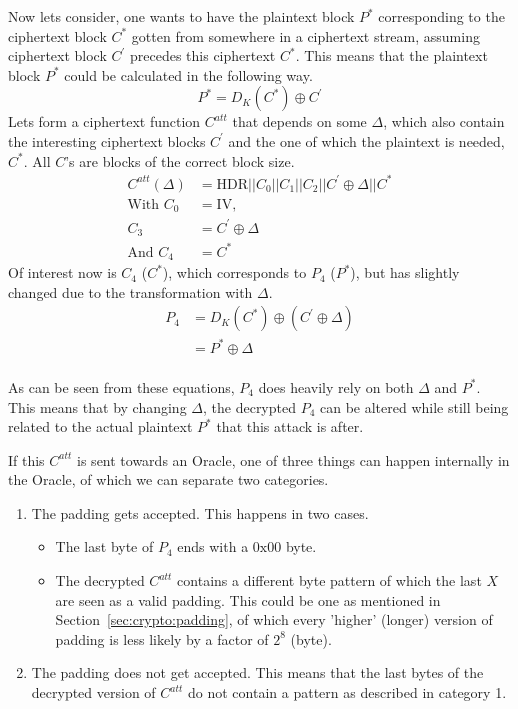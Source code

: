 \documentclass[10pt,conference,a4paper]{IEEEtran}
\begin{document}
Now lets consider, one wants to have the plaintext block $P^{*}$ corresponding to the ciphertext block $C^{*}$ gotten from somewhere in a ciphertext stream, assuming ciphertext block $C^{'}$ precedes this ciphertext $C^{*}$. This means that the plaintext block $P^{*}$ could be calculated in the following way.
\[ P^{*} = D_K(C^{*}) \oplus C^{'} \]
Lets form a ciphertext function $C^{att}$ that depends on some $\Delta$, which also contain the interesting ciphertext blocks $C^{'}$ and the one of which the plaintext is needed, $C^{*}$. All $C$'s are blocks of the correct block size.
\[ \begin{split}
C^{att}(\Delta) &= \text{HDR} || C_0 || C_1 || C_2 || C^{'} \oplus \Delta || C^{*} \\
\text{With } C_0 &= \text{IV}, \\
C_3 &= C^{'} \oplus \Delta \\
\text{And } C_4 &= C^{*}
\end{split}  \]
Of interest now is $C_4$ ($C^{*}$), which corresponds to $P_4$ ($P^{*}$), but has slightly changed due to the transformation with $\Delta$.
\[ \begin{split}
P_4 &= D_K(C^{*}) \oplus (C^{'} \oplus \Delta) \\
&= P^{*} \oplus \Delta \\
\end{split} \]

As can be seen from these equations, $P_4$ does heavily rely on both $\Delta$ and $P^{*}$. This means that by changing $\Delta$, the decrypted $P_4$ can be altered while still being related to the actual plaintext $P^{*}$ that this attack is after.

If this $C^{att}$ is sent towards an Oracle, one of three things can happen internally in the Oracle, of which we can separate two categories.
\begin{enumerate}
  \item The padding gets accepted. This happens in two cases.
	\begin{itemize}
		\item The last byte of $P_4$ ends with a $0\text{x}00$ byte.
		\item The decrypted $C^{att}$ contains a different byte pattern of which the last $X$ are seen as a valid padding. This could be one as mentioned in Section~\ref{sec:crypto:padding}, of which every 'higher' (longer) version of padding is less likely by a factor of $2^8$ (byte).
	\end{itemize}
  \item The padding does not get accepted. This means that the last bytes of the decrypted version of $C^{att}$ do not contain a pattern as described in category 1. 
\end{enumerate}
\end{document}
